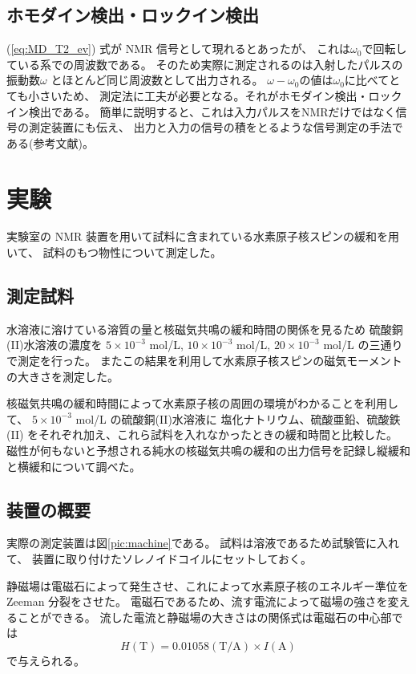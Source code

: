 \documentclass[11pt,dvipdfmx,a4paper]{jsarticle}
\begin{document}
\subsection{ホモダイン検出・ロックイン検出}
(\ref{eq:MD_T2_ev}) 式が NMR 信号として現れるとあったが、
これは\(\omega_0\)で回転している系での周波数である。
そのため実際に測定されるのは入射したパルスの振動数\(\omega\)
とほとんど同じ周波数として出力される。
\(\omega-\omega_0\)の値は\(\omega_0\)に比べてとても小さいため、
測定法に工夫が必要となる。それがホモダイン検出・ロックイン検出である。
簡単に説明すると、これは入力パルスをNMRだけではなく信号の測定装置にも伝え、
出力と入力の信号の積をとるような信号測定の手法である(参考文献\cite{Morita_2010})。

\clearpage

\section{実験}
実験室の NMR 装置を用いて試料に含まれている水素原子核スピンの緩和を用いて、
試料のもつ物性について測定した。
\subsection{測定試料}
水溶液に溶けている溶質の量と核磁気共鳴の緩和時間の関係を見るため
硫酸銅(II)水溶液の濃度を
\(5\times 10^{-3}\) mol/L,
\(10\times 10^{-3}\) mol/L,
\(20\times 10^{-3}\) mol/L
の三通りで測定を行った。
またこの結果を利用して水素原子核スピンの磁気モーメントの大きさを測定した。

核磁気共鳴の緩和時間によって水素原子核の周囲の環境がわかることを利用して、
\(5\times 10^{-3}\) mol/L の硫酸銅(II)水溶液に
塩化ナトリウム、硫酸亜鉛、硫酸鉄(II)
をそれぞれ加え、これら試料を入れなかったときの緩和時間と比較した。
磁性が何もないと予想される純水の核磁気共鳴の緩和の出力信号を記録し縦緩和と横緩和について調べた。

\subsection{装置の概要}
実際の測定装置は図\ref{pic:machine}である。
試料は溶液であるため試験管に入れて、
装置に取り付けたソレノイドコイルにセットしておく。

静磁場は電磁石によって発生させ、これによって水素原子核のエネルギー準位を Zeeman 分裂をさせた。
電磁石であるため、流す電流によって磁場の強さを変えることができる。
流した電流と静磁場の大きさはの関係式は電磁石の中心部では
\begin{equation}
	H (\text{T}) = 0.01058 (\text{T/A}) \times I (\text{A})
	\end{equation}
で与えられる。
\end{document}
